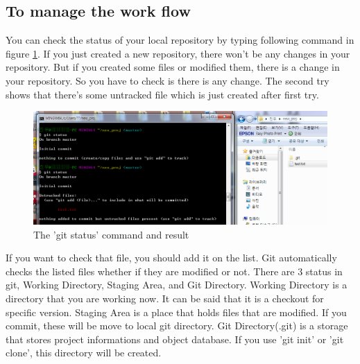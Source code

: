 \documentclass{article}
\begin{document}
    \subsection {To manage the work flow}
    You can check the status of your local repository by typing following command in figure \ref{fig:status}. If you just created a new repository, there won't be any changes in your repository. But if you created some files or modified them, there is a change in your repository. So you have to check is there is any change. The second try shows that there's some untracked file which is just created after first try.
    \begin{figure}[h!]
    \centering
    \includegraphics[scale=0.5]{git_status}
    \caption{The 'git status' command and result}
    \label{fig:status}
    \end{figure}
    
    If you want to check that file, you should add it on the list. Git automatically checks the listed files whether if they are modified or not. There are 3 status in git, Working Directory, Staging Area, and Git Directory. Working Directory is a directory that you are working now. It can be said that it is a checkout for specific version.
    Staging Area is a place that holds files that are modified. If you commit, these will be move to local git directory.
    Git Directory(.git) is a storage that stores project informations and object database. If you use 'git init' or 'git clone', this directory will be created.
    
    
\end{document}
